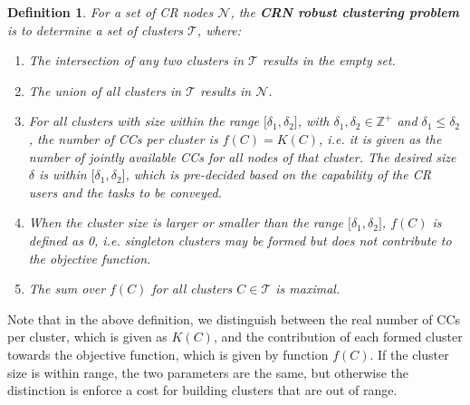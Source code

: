 \documentclass[times]{ettauth}
\theoremstyle{mytheoremstyle}
\theoremstyle{mytheoremstyle}
\theoremstyle{mytheoremstyle}
\newtheorem{mydef}{Definition}
\begin{document}
\begin{mydef}
\label{def_centralized_clustering}
For a set of CR nodes $\mathcal{N}$, the \textbf{CRN robust clustering problem} is to determine a set of clusters $\mathcal{T}$, where:
\begin{enumerate}
\setlength{\itemindent}{.05in}
\item The intersection of any two clusters in $\mathcal{T}$ results in the empty set.
\item The union of all clusters in $\mathcal{T}$ results in $\mathcal{N}$.
\item For all clusters with size within the range $\big[\delta_1, \delta_2\big]$, with $\delta_1, \delta_2\in \mathbb{Z}^+$ and $\delta_1 \leq \delta_2$, the number of CCs per cluster is $f(C) = K(C)$, i.e. it is given as the number of jointly available CCs for all nodes of that cluster. 
The desired size $\delta$ is within $\big[\delta_1, \delta_2\big]$, which is pre-decided based on the capability of the CR users and the tasks to be conveyed.
\item When the cluster size is larger or smaller than the range $\big[\delta_1, \delta_2\big]$, $f(C)$ is defined as 0, i.e. singleton clusters may be formed but does not contribute to the objective function.
\item The sum over $f(C)$ for all clusters $C \in \mathcal{T}$ is maximal.
\end{enumerate}
\end{mydef}
Note that in the above definition, we distinguish between the real number of CCs per cluster, which is given as $K(C)$, and the contribution of each formed cluster towards the objective function, which is given by function $f(C)$.
If the cluster size is within range, the two parameters are the same, but otherwise the distinction is enforce a cost for building clusters that are out of range.
\end{document}

